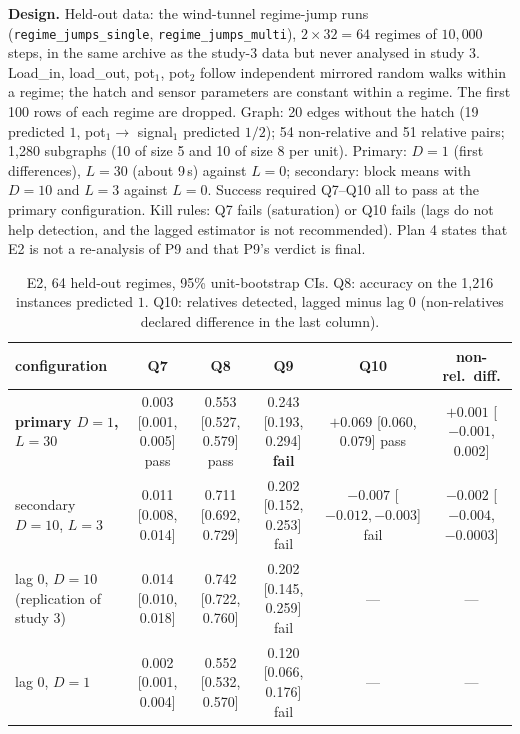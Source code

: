 \textbf{Design.} Held-out data: the wind-tunnel regime-jump runs (\texttt{regime\_\allowbreak jumps\_\allowbreak single}, \texttt{regime\_\allowbreak jumps\_\allowbreak multi}), $2\times32=64$ regimes of $10{,}000$ steps, in the same archive as the study-3 data but never analysed in study 3.
Load\_\allowbreak in, load\_\allowbreak out, pot$_1$, pot$_2$ follow independent mirrored random walks within a regime; the hatch and sensor parameters are constant within a regime. The first 100 rows of each regime are dropped. Graph: 20 edges without the hatch (19 predicted $1$, pot$_1\to$ signal$_1$ predicted $1/2$); 54 non-relative and 51 relative pairs; 1{,}280 subgraphs (10 of size 5 and 10 of size 8 per unit). Primary: $D=1$ (first differences), $L=30$ (about 9\,s) against $L=0$; secondary: block means with $D=10$ and $L=3$ against $L=0$.
Success required Q7--Q10 all to pass at the primary configuration. Kill rules: Q7 fails (saturation) or Q10 fails (lags do not help detection, and the lagged estimator is not recommended). Plan 4 states that E2 is not a re-analysis of P9 and that P9's verdict is final.

\begin{table}[h]
\caption{E2, 64 held-out regimes, 95\% unit-bootstrap CIs. Q8: accuracy on the 1{,}216 instances predicted $1$. Q10: relatives detected, lagged minus lag 0 (non-relatives declared difference in the last column).}
\label{tab:e2}
\centering\tiny
\setlength{\tabcolsep}{3pt}
\begin{tabular}{lccccc}
\toprule
configuration & Q7 & Q8 & Q9 & Q10 & non-rel.\ diff. \\
\midrule
\textbf{primary $D{=}1$, $L{=}30$} & 0.003 [0.001, 0.005] pass & 0.553 [0.527, 0.579] pass & 0.243 [0.193, 0.294] \textbf{fail} & $+0.069$ [0.060, 0.079] pass & $+0.001$ [$-0.001$, 0.002] \\
secondary $D{=}10$, $L{=}3$ & 0.011 [0.008, 0.014] & 0.711 [0.692, 0.729] & 0.202 [0.152, 0.253] fail & $-0.007$ [$-0.012,-0.003$] fail & $-0.002$ [$-0.004$, $-0.0003$] \\
lag 0, $D{=}10$ (replication of study 3) & 0.014 [0.010, 0.018] & 0.742 [0.722, 0.760] & 0.202 [0.145, 0.259] fail & --- & --- \\
lag 0, $D{=}1$ & 0.002 [0.001, 0.004] & 0.552 [0.532, 0.570] & 0.120 [0.066, 0.176] fail & --- & --- \\
\bottomrule
\end{tabular}
\end{table}

